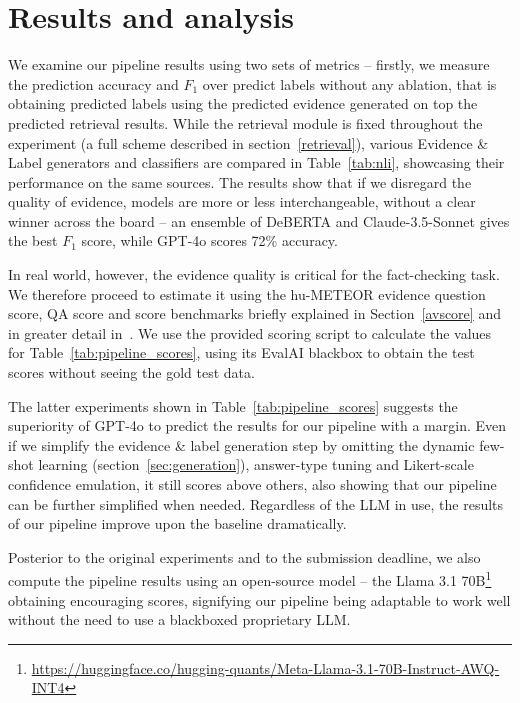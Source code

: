 
\section{Results and analysis}
\label{sec:results}

We examine our pipeline results using two sets of metrics -- firstly, we measure the prediction accuracy and $F_1$ over predict labels without any ablation, that is obtaining predicted labels using the predicted evidence generated on top the predicted retrieval results. 
While the retrieval module is fixed throughout the experiment (a full scheme described in section~\ref{retrieval}), various Evidence \& Label generators and classifiers are compared in Table~\ref{tab:nli}, showcasing their performance on the same sources.
The results show that if we disregard the quality of evidence, models are more or less interchangeable, without a clear winner across the board -- an ensemble of DeBERTA and Claude-3.5-Sonnet gives the best $F_1$ score, while GPT-4o scores 72\% accuracy.
\begin{table}[H]\end{table}

\begin{table*}[h]\end{table*}
In real world, however, the evidence quality is critical for the fact-checking task.
We therefore proceed to estimate it using the hu-METEOR evidence question score, QA score and \averitec{} score benchmarks briefly explained in Section~\ref{avscore} and in greater detail in~\cite{averitec2024}.
We use the provided \averitec{} scoring script to calculate the values for Table~\ref{tab:pipeline_scores}, using its EvalAI blackbox to obtain the test scores without seeing the gold test data.

The latter experiments shown in Table~\ref{tab:pipeline_scores} suggests the superiority of GPT-4o to predict the results for our pipeline with a margin.
Even if we simplify the evidence \& label generation step by omitting the dynamic few-shot learning (section~\ref{sec:generation}), answer-type tuning and Likert-scale confidence emulation, it still scores above others, also showing that our pipeline can be further simplified when needed.
Regardless of the LLM in use, the results of our pipeline improve upon the \averitec{} baseline dramatically.

Posterior to the original experiments and to the \averitec{} submission deadline, we also compute the pipeline results using an open-source model -- the Llama 3.1 70B\footnote{\url{https://huggingface.co/hugging-quants/Meta-Llama-3.1-70B-Instruct-AWQ-INT4}}~\cite{dubey2024llama3herdmodels} obtaining encouraging scores, signifying our pipeline being adaptable to work well without the need to use a blackboxed proprietary LLM.

